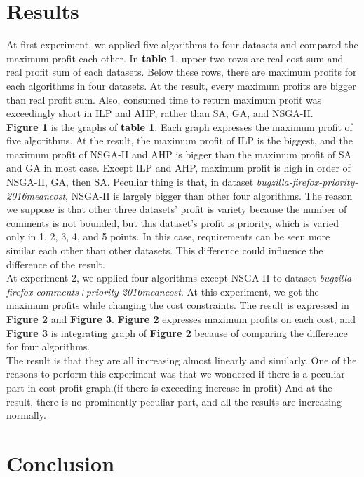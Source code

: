 \section{Results}
At first experiment, we applied five algorithms to four datasets and compared the maximum profit each other. In \textbf{table 1}, upper two rows are real cost sum and real profit sum of each datasets. Below these rows, there are maximum profits for each algorithms in four datasets. At the result, every maximum profits are bigger than real profit sum. Also, consumed time to return maximum profit was exceedingly short in ILP and AHP, rather than SA, GA, and NSGA-II. \\
\textbf{Figure 1} is the graphs of \textbf{table 1}. Each graph expresses the maximum profit of five algorithms. At the result, the maximum profit of ILP is the biggest, and the maximum profit of NSGA-II and AHP is bigger than the maximum profit of SA and GA in most case. Except ILP and AHP, maximum profit is high in order of NSGA-II, GA, then SA. Peculiar thing is that, in dataset \textit{bugzilla-firefox-priority-2016meancost}, NSGA-II is largely bigger than other four algorithms. The reason we suppose is that other three datasets' profit is variety because the number of comments is not bounded, but this dataset's profit is priority, which is varied only in 1, 2, 3, 4, and 5 points. In this case, requirements can be seen more similar each other than other datasets. This difference could influence the difference of the result.\\
At experiment 2, we applied four algorithms except NSGA-II to dataset \textit{bugzilla-firefox-comments+priority-2016meancost}. At this experiment, we got the maximum profits while changing the cost constraints. The result is expressed in \textbf{Figure 2} and \textbf{Figure 3}. \textbf{Figure 2} expresses maximum profits on each cost, and \textbf{Figure 3} is integrating graph of \textbf{Figure 2} because of comparing the difference for four algorithms. \\
The result is that they are all increasing almost linearly and similarly. One of the reasons to perform this experiment was that we wondered if there is a peculiar part in cost-profit graph.(if there is exceeding increase in profit) And at the result, there is no prominently peculiar part, and all the results are increasing normally.
\section{Conclusion}




